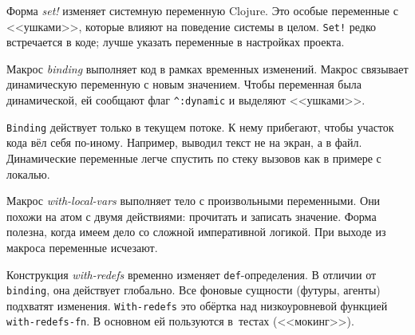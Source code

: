 Форма \emph{set!} изменяет системную переменную Clojure. Это особые переменные с
<<ушками>>, которые влияют на поведение системы в целом. \verb|Set!| редко
встречается в коде; лучше указать переменные в настройках проекта.

Макрос \emph{binding} выполняет код в рамках временных изменений. Макрос
связывает динамическую переменную с новым значением. Чтобы переменная была
динамической, ей сообщают флаг \verb|^:dynamic| и выделяют <<ушками>>.

\verb|Binding| действует только в текущем потоке. К нему прибегают, чтобы
участок кода вёл себя по-иному. Например, выводил текст не на экран, а в
файл. Динамические переменные легче спустить по стеку вызовов как в примере с
локалью.

Макрос \emph{with-local-vars} выполняет тело с произвольными переменными. Они
похожи на атом с двумя действиями: прочитать и записать значение. Форма полезна,
когда имеем дело со сложной императивной логикой. При выходе из макроса
переменные исчезают.

Конструкция \emph{with-redefs} временно изменяет \verb|def|-определения. В
отличии от \verb|binding|, она действует глобально. Все фоновые сущности
(футуры, агенты) подхватят изменения. \verb|With-redefs| это обёртка над
низкоуровневой функцией \verb|with-redefs-fn|. В основном ей пользуются
в~тестах (<<мокинг>>).
